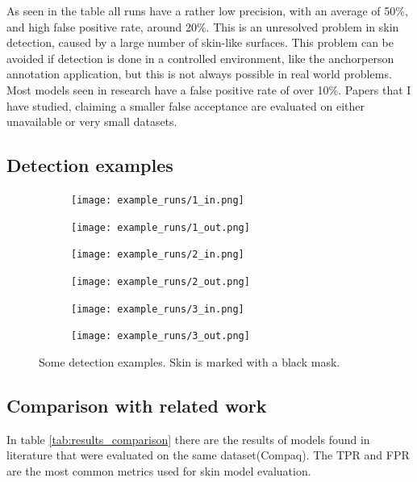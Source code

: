 \documentclass[12pt]{report}
\begin{document}
	As seen in the table all runs have a rather low precision, with an average of 50\%, and high false positive rate, around 20\%. This is an unresolved problem in skin detection, caused by a large number of skin-like surfaces. This problem can be avoided if detection is done in a controlled environment, like the anchorperson annotation application, but this is not always possible in real world problems.  Most models seen in research have a false positive rate of over 10\%. Papers that I have studied, claiming a smaller false acceptance are evaluated on either unavailable or very small datasets.
	
	\subsection{Detection examples}
	\begin{figure}[h!]
		\centering
		\begin{subfigure}[b]{0.4\linewidth}
			\texttt{[image: example\_runs/1\_in.png]}
		\end{subfigure}
		\begin{subfigure}[b]{0.4\linewidth}
			\texttt{[image: example\_runs/1\_out.png]}
		\end{subfigure}
	
		
		\begin{subfigure}[b]{0.4\linewidth}
			\texttt{[image: example\_runs/2\_in.png]}
		\end{subfigure}
		\begin{subfigure}[b]{0.4\linewidth}
			\texttt{[image: example\_runs/2\_out.png]}
		\end{subfigure}
	
		\begin{subfigure}[b]{0.4\linewidth}
			\texttt{[image: example\_runs/3\_in.png]}
		\end{subfigure}
		\begin{subfigure}[b]{0.4\linewidth}
			\texttt{[image: example\_runs/3\_out.png]}
		\end{subfigure}
	
		\caption{Some detection examples. Skin is marked with a black mask.}
		\label{fig:example_detection}
	\end{figure}

	\subsection{Comparison with related work}
	
	In table \ref{tab:results_comparison} there are the results of models found in literature that were evaluated on the same dataset(Compaq). The TPR and FPR are the most common metrics used for skin model evaluation.
	
\end{document}
